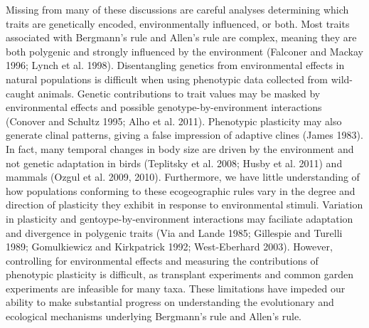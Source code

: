 \documentclass[]{article}
\begin{document}
Missing from many of these discussions are careful analyses determining
which traits are genetically encoded, environmentally influenced, or
both. Most traits associated with Bergmann's rule and Allen's rule are
complex, meaning they are both polygenic and strongly influenced by the
environment (Falconer and Mackay 1996; Lynch et al. 1998). Disentangling
genetics from environmental effects in natural populations is difficult
when using phenotypic data collected from wild-caught animals. Genetic
contributions to trait values may be masked by environmental effects and
possible genotype-by-environment interactions (Conover and Schultz 1995;
Alho et al. 2011). Phenotypic plasticity may also generate clinal
patterns, giving a false impression of adaptive clines (James 1983). In
fact, many temporal changes in body size are driven by the environment
and not genetic adaptation in birds (Teplitsky et al. 2008; Husby et al.
2011) and mammals (Ozgul et al. 2009, 2010). Furthermore, we have little
understanding of how populations conforming to these ecogeographic rules
vary in the degree and direction of plasticity they exhibit in response
to environmental stimuli. Variation in plasticity and
gentoype-by-environment interactions may faciliate adaptation and
divergence in polygenic traits (Via and Lande 1985; Gillespie and
Turelli 1989; Gomulkiewicz and Kirkpatrick 1992; West-Eberhard 2003).
However, controlling for environmental effects and measuring the
contributions of phenotypic plasticity is difficult, as transplant
experiments and common garden experiments are infeasible for many taxa.
These limitations have impeded our ability to make substantial progress
on understanding the evolutionary and ecological mechanisms underlying
Bergmann's rule and Allen's rule.
\end{document}
